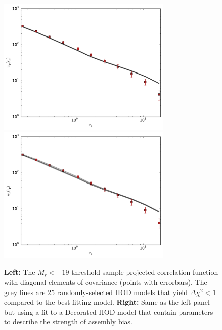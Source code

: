\documentclass[usenatbib,usegraphicx,letterpaper]{mn2e}
\begin{document}
\begin{figure}
\begin{center}
\includegraphics[width=8.3cm]{Mr19samples.pdf}
\includegraphics[width=8.3cm]{Mr19ABsamples.pdf}
\caption{
{\bf Left:} The $M_r<-19$ threshold sample projected correlation function with diagonal elements of 
covariance (points with errorbars). The grey lines are 25 randomly-selected HOD models that yield 
$\Delta \chi^2 <1$ compared to the best-fitting model. {\bf Right:} Same as the left panel but using a 
fit to a Decorated HOD model that contain parameters to describe the strength of assembly bias.
}
\label{fig:Mr19samples}
\end{center}
\end{figure}
\end{document}
